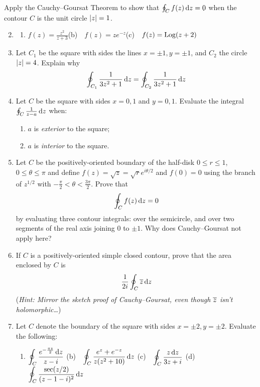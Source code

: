 \begin{exercises*}
	\exstart Apply the Cauchy--Goursat Theorem to show that $\oint_Cf(z)\,{\mathrm{d} z}=0$ when the contour $C$ is the unit circle $\left| z\right|=1$.
	\begin{enumerate}\setcounter{enumi}{1}
	  \item[]\begin{enumerate}
	    \item $\displaystyle f(z)=\frac{z^2}{z+3}$\qquad (b)\ \ $\displaystyle f(z)=ze^{-z}$\qquad (c)\ \ $\displaystyle f(z)=\operatorname{Log}(z+2)$
		\end{enumerate}
		
		
		\item Let $C_1$ be the square with sides the lines $x=\pm 1,y=\pm 1$, and $C_2$ the circle $\left| z\right|=4$. Explain why
		\[
			\oint_{C_1}\frac 1{3z^2+1}\,{\mathrm{d} z}=\oint_{C_2}\frac 1{3z^2+1}\,{\mathrm{d} z}
		\]
		
		
		\item Let $C$ be the square with sides $x=0,1$ and $y=0,1$. Evaluate the integral $\oint_C\frac 1{z-a}\,{\mathrm{d} z}$ when:
		\begin{enumerate}
		  \item $a$ is \emph{exterior} to the square;
		  \item $a$ is \emph{interior} to the square.
		\end{enumerate}
		
		
		\item Let $C$ be the positively-oriented boundary of the half-disk $0\le r\le 1$, $0\le\theta\le\pi$ and define $f(z)=\sqrt z=\sqrt re^{i\theta/2}$ and $f(0)=0$ using the branch of $z^{1/2}$ with $-\frac{\pi}2<\theta<\frac{3\pi}2$. Prove that
		\[
			\oint_Cf(z)\,{\mathrm{d} z}=0
		\]
		by evaluating three contour integrals: over the semicircle, and over two segments of the real axis joining 0 to $\pm 1$. Why does Cauchy--Goursat not apply here?
		
		\item If $C$ is a positively-oriented simple closed contour, prove that the area enclosed by $C$ is
		\[\frac 1{2i}\oint_C\overline{z}\,{\mathrm{d} z}\]
		(\emph{Hint: Mirror the sketch proof of Cauchy--Goursat, even though $\overline{z}$ isn't holomorphic\ldots})
		
		
	  \item Let $C$ denote the boundary of the square with sides $x=\pm 2,y=\pm 2$. Evaluate the following:
	  \begin{enumerate}
	    \item $\displaystyle\oint_C\frac{e^{-\frac{\pi z}2}\,{\mathrm{d} z}}{z-i}$\qquad 
	   	(b)\ \ $\displaystyle\oint_C\frac{e^z+e^{-z}}{z(z^2+10)}\,{\mathrm{d} z}$\qquad 
	   	(c)\ \ $\displaystyle\oint_C\frac{z\,{\mathrm{d} z}}{3z+i}$\qquad 
	   	(d)\ \ $\displaystyle\oint_C\frac{\sec(z/2)}{(z-1-i)^2}\,{\mathrm{d} z}$
	  \end{enumerate}
	  

\end{enumerate}
\end{exercises*}
